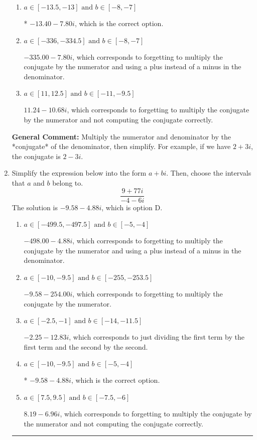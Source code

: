 \documentclass{extbook}[14pt]
\newcommand{\litem}[1]{\item #1

\rule{\textwidth}{0.4pt}}
\begin{document}
\begin{enumerate}
{\begin{enumerate}[label=\Alph*.]
 $-3.00  - 19.25 i$, which corresponds to just dividing the first term by the first term and the second by the second.
\item \( a \in [-13.5, -13] \text{ and } b \in [-8, -7] \)

* $-13.40  - 7.80 i$, which is the correct option.
\item \( a \in [-336, -334.5] \text{ and } b \in [-8, -7] \)

 $-335.00  - 7.80 i$, which corresponds to forgetting to multiply the conjugate by the numerator and using a plus instead of a minus in the denominator.
\item \( a \in [11, 12.5] \text{ and } b \in [-11, -9.5] \)

 $11.24  - 10.68 i$, which corresponds to forgetting to multiply the conjugate by the numerator and not computing the conjugate correctly.
\end{enumerate}

\textbf{General Comment:} Multiply the numerator and denominator by the *conjugate* of the denominator, then simplify. For example, if we have $2+3i$, the conjugate is $2-3i$.
}
\litem{
Simplify the expression below into the form $a+bi$. Then, choose the intervals that $a$ and $b$ belong to.
\[ \frac{9 + 77 i}{-4 - 6 i} \]The solution is \( -9.58  - 4.88 i \), which is option D.\begin{enumerate}[label=\Alph*.]
\item \( a \in [-499.5, -497.5] \text{ and } b \in [-5, -4] \)

 $-498.00  - 4.88 i$, which corresponds to forgetting to multiply the conjugate by the numerator and using a plus instead of a minus in the denominator.
\item \( a \in [-10, -9.5] \text{ and } b \in [-255, -253.5] \)

 $-9.58  - 254.00 i$, which corresponds to forgetting to multiply the conjugate by the numerator.
\item \( a \in [-2.5, -1] \text{ and } b \in [-14, -11.5] \)

 $-2.25  - 12.83 i$, which corresponds to just dividing the first term by the first term and the second by the second.
\item \( a \in [-10, -9.5] \text{ and } b \in [-5, -4] \)

* $-9.58  - 4.88 i$, which is the correct option.
\item \( a \in [7.5, 9.5] \text{ and } b \in [-7.5, -6] \)

 $8.19  - 6.96 i$, which corresponds to forgetting to multiply the conjugate by the numerator and not computing the conjugate correctly.
\end{enumerate}

}
\end{enumerate}
\end{document}
